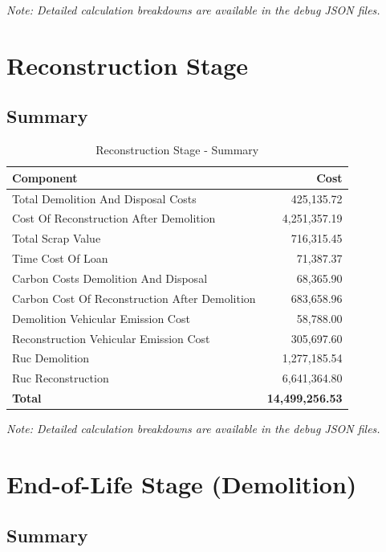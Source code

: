 \documentclass[12pt,a4paper]{article}
\begin{document}
\textit{Note: Detailed calculation breakdowns are available in the debug JSON files.}

\section{Reconstruction Stage}

\subsection{Summary}

\begin{table}[H]
\centering
\begin{tabular}{lr}
\toprule
\textbf{Component} & \textbf{Cost} \\
\midrule
Total Demolition And Disposal Costs & 425,135.72 \\
Cost Of Reconstruction After Demolition & 4,251,357.19 \\
Total Scrap Value & 716,315.45 \\
Time Cost Of Loan & 71,387.37 \\
Carbon Costs Demolition And Disposal & 68,365.90 \\
Carbon Cost Of Reconstruction After Demolition & 683,658.96 \\
Demolition Vehicular Emission Cost & 58,788.00 \\
Reconstruction Vehicular Emission Cost & 305,697.60 \\
Ruc Demolition & 1,277,185.54 \\
Ruc Reconstruction & 6,641,364.80 \\
\midrule
\textbf{Total} & \textbf{14,499,256.53} \\
\bottomrule
\end{tabular}
\caption{Reconstruction Stage - Summary}
\end{table}

\textit{Note: Detailed calculation breakdowns are available in the debug JSON files.}

\section{End-of-Life Stage (Demolition)}

\subsection{Summary}
\end{document}
